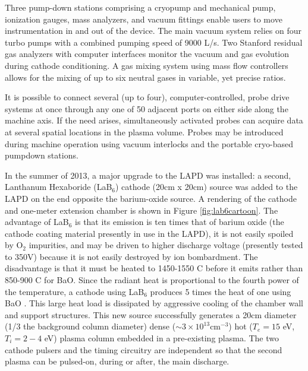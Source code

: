 \documentclass[11pt]{article}
\begin{document}
Three pump-down stations comprising a cryopump and mechanical pump, ionization gauges, mass analyzers, and vacuum fittings enable users to move instrumentation in and out of the device.  The main vacuum system relies on four turbo pumps with a combined pumping speed of 9000 L/s.  Two Stanford residual gas analyzers with computer interfaces monitor the vacuum and gas evolution during cathode conditioning.   A gas mixing system using mass flow controllers allows for the mixing of up to six neutral gases in variable, yet precise ratios.

		It is possible to connect several (up to four), computer-controlled, probe drive systems at once through any one of 50 adjacent ports on either side along the machine axis.  If the need arises, simultaneously activated probes can acquire data at several spatial locations in the plasma volume.  Probes may be introduced during machine operation using vacuum interlocks and the portable cryo-based pumpdown stations. 
		
		
		In the summer of 2013, a major upgrade to the LAPD was installed: a second, Lanthanum Hexaboride (LaB$_{6}$) cathode (20cm x 20cm)  source was added to the LAPD on the end opposite the barium-oxide source. A rendering of the cathode and one-meter extension chamber is shown in Figure \ref{fig:lab6cartoon}. The advantage of LaB$_{6}$ is that its emission is ten times that of barium oxide (the cathode coating material presently in use in the LAPD), it is not easily spoiled by O$_{2}$ impurities, and may be driven to higher discharge voltage (presently tested to 350V) because it is not easily destroyed by ion bombardment.  The disadvantage is that it must be heated to 1450-1550 C before it emits rather than 850-900 C for BaO.  Since the radiant heat is proportional to the fourth power of the temperature, a cathode using LaB$_{6}$ produces 5 times the heat of one using BaO .  This large heat load is dissipated by aggressive cooling of the chamber wall and support structures.   This new source successfully generates a 20cm diameter (1/3 the background column diameter) dense ($\sim 3\times 10^{13}$cm$^{-3}$) hot ($T_{e}=15$ eV, $T_{i}=2-4$ eV) plasma column embedded in a pre-existing plasma.  The two cathode pulsers and the timing circuitry are independent so that the second plasma can be pulsed-on, during or after, the main discharge.
\end{document}
